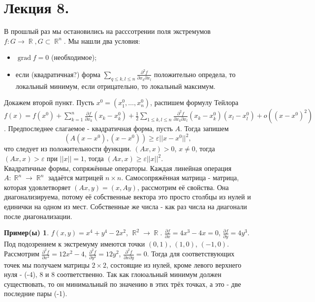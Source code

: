 \documentclass[a4paper,100pt]{article}
\theoremstyle{indented}
\theoremstyle{definition}
\newtheorem{exl}{Пример(ы)}
\theoremstyle{remark}
\DeclareMathOperator{\RR}{\mathbb{R}}
\DeclareMathOperator{\grad}{grad}
\begin{document}
\section{Лекция 8.}

В прошлый раз мы остановились на расссотрении поля экстремумов $f: G \rightarrow \RR, G \subset \RR^n$. Мы нашли два условия: 

\begin{itemize}
    \item $\grad f =0$ (необходимое); 
    \item если (квадратичная?) форма $\sum_{q\leq k, l\leq n}\frac{\partial^2 f}{\partial x_k \partial x_l}$ положительно определа, то локальный минимум, если отрицательно, то локальный максимум.
\end{itemize}

Докажем второй пункт. Пусть $x^0=(x_1^0, \ldots, x_n^0)$, распишем формулу Тейлора $f(x)=f(x^0)+\sum_{k=1}^n\frac{\partial f}{\partial x_k}(x_k-x_k^0)+\frac{1}{2}\sum_{1\leq k, l \leq n}\frac{\partial^2 f}{\partial x_k \partial x_l}(x_k-x_k^0)(x_l-x_l^0)+o((x-x^0)^2)$. Предпоследнее слагаемое - квадратичная форма, пусть $A$. Тогда запишем
\[
    (A(x-x^0), (x-x^0))\geq \varepsilon ||x-x^0||^2, 
\]
что следует из положительности функции. $(Ax, x)>0$, $x\neq 0$, тогда $(Ax, x)>\varepsilon$ при $||x||=1$, тогда $(Ax, x)\geq \varepsilon ||x||^2$. \\ 

Квадратичные формы, сопряжённые операторы. Каждая линейная операция $A:\RR^n\rightarrow \RR^n$ задаётся матрицей $n\times n$. Самосопряжённая матрица - матрица, которая удовлетворяет $(Ax, y)=(x, Ay)$, рассмотрим её свойства. Она диагонализируема, потому её собственные вектора это просто столбцы из нулей и единички на одном из мест. Собственные же числа - как раз числа на диагонали после диагонализации.

\begin{exl}
    $f(x, y)=x^4+y^4-2x^2$, $\RR^2\rightarrow \RR$. $\frac{\partial f}{\partial x}=4x^3-4x=0$, $\frac{\partial f}{\partial y}=4y^3$. Под подозрением к экстремуму имеются точки $(0, 1)$, $(1, 0)$, $(-1, 0)$. Рассмотрим $\frac{\partial^2 f}{\partial x^2}=12x^2-4$, $\frac{\partial^2 f}{\partial y^2}=12y^2$, $\frac{\partial^2 f}{\partial x \partial y}= 0$. Тогда для соответствующих точек мы получаем матрицы $2\times 2$, состоящие из нулей, кроме левого верхнего нуля - (-4), 8 и 8 соответственно. Так как глоюальный минимум должен существовать, то он минимальный по значению в этих трёх точках, а это - две последние пары (-1). 
\end{exl}
\end{document}
